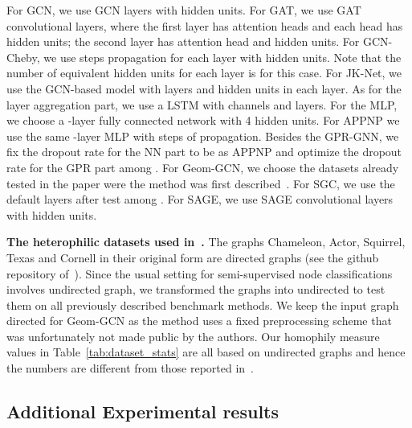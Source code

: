 \documentclass{article} \usepackage{iclr2021_conference,times}
\begin{document}
For GCN, we use  GCN layers with  hidden units. For GAT, we use  GAT convolutional layers, where the first layer has  attention heads and each head has  hidden units; the second layer has  attention head and  hidden units. For GCN-Cheby, we use  steps propagation for each layer with  hidden units. Note that the number of equivalent hidden units for each layer is for this case. For JK-Net, we use the GCN-based model with  layers and  hidden units in each layer. As for the layer aggregation part, we use a LSTM with  channels and  layers. For the MLP, we choose a -layer fully connected network with 4 hidden units. For APPNP we use the same -layer MLP with  steps of propagation. Besides the GPR-GNN, we fix the dropout rate for the NN part to be  as APPNP and optimize the dropout rate for the GPR part among . For Geom-GCN, we choose the datasets already tested in the paper were the method was first described~\citep{pei2019geom}. For SGC, we use the default  layers after test among . For SAGE, we use  SAGE convolutional layers with  hidden units.

\textbf{The heterophilic datasets used in~\citep{pei2019geom}. }The graphs Chameleon, Actor, Squirrel, Texas and Cornell in their original form are directed graphs (see the github repository of~\citep{pei2019geom}). Since the usual setting for semi-supervised node classifications involves undirected graph, we transformed the graphs into undirected to test them on all previously described benchmark methods. We keep the input graph directed for Geom-GCN as the method uses a fixed preprocessing scheme that was unfortunately not made public by the authors. Our homophily measure values  in Table~\ref{tab:dataset_stats} are all based on undirected graphs and hence the numbers are different from those reported in~\citep{pei2019geom}.




\subsection{Additional Experimental results}
\end{document}
